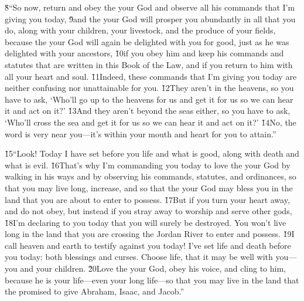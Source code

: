 \v{8}``So now, return and obey the  your God and observe all his commands that I'm giving you today, \v{9}and the  your God will prosper you abundantly in all that you do, along with your children, your livestock, and the produce of your fields, because the  your God will again be delighted with you for good, just as he was delighted with your ancestors, \v{10}if you obey him and keep his commands and statutes that are written in this Book of the Law, and if you return to him with all your heart and soul. \v{11}Indeed, these commands that I'm giving you today are neither confusing nor unattainable for you. \v{12}They aren't in the heavens, so you have to ask, `Who'll go up to the heavens for us and get it for us so we can hear it and act on it?' \v{13}And they aren't beyond the seas either, so you have to ask, `Who'll cross the sea and get it for us so we can hear it and act on it?' \v{14}No, the word is very near you---it's within your mouth and heart for you to attain.''

\v{15}``Look! Today I have set before you life and what is good, along with death and what is evil. \v{16}That's why I'm commanding you today to love the  your God by walking in his ways and by observing his commands, statutes, and ordinances, so that you may live long, increase, and so that the  your God may bless you in the land that you are about to enter to possess. \v{17}But if you turn your heart away, and do not obey, but instead if you stray away to worship and serve other gods, \v{18}I'm declaring to you today that you will surely be destroyed. You won't live long in the land that you are crossing the Jordan River to enter and possess. \v{19}I call heaven and earth to testify against you today! I've set life and death before you today: both blessings and curses. Choose life, that it may be well with you---you and your children. \v{20}Love the  your God, obey his voice, and cling to him, because he is your life---even your long life---so that you may live in the land that the  promised to give Abraham, Isaac, and Jacob.''

